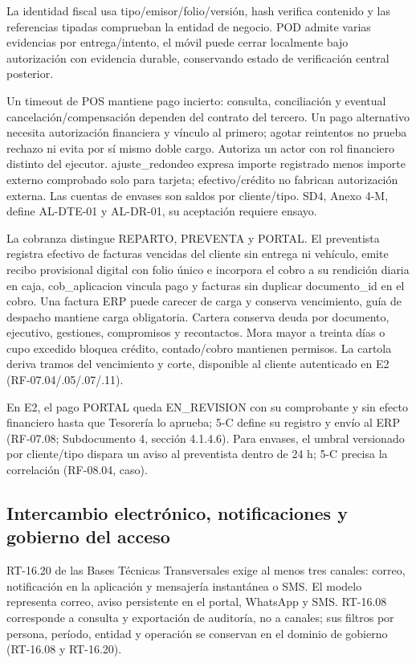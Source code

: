 La identidad fiscal usa tipo/emisor/folio/versión, hash verifica contenido y las referencias tipadas comprueban la entidad de negocio. POD admite varias evidencias por entrega/intento, el móvil puede cerrar localmente bajo autorización con evidencia durable, conservando estado de verificación central posterior.

Un timeout de POS mantiene pago incierto: consulta, conciliación y eventual cancelación/compensación dependen del contrato del tercero. Un pago alternativo necesita autorización financiera y vínculo al primero; agotar reintentos no prueba rechazo ni evita por sí mismo doble cargo. Autoriza un actor con rol financiero distinto del ejecutor. ajuste\_redondeo expresa importe registrado menos importe externo comprobado solo para tarjeta; efectivo/crédito no fabrican autorización externa. Las cuentas de envases son saldos por cliente/tipo. SD4, Anexo 4-M, define AL-DTE-01 y AL-DR-01, su aceptación requiere ensayo.

La cobranza distingue REPARTO, PREVENTA y PORTAL. El preventista registra efectivo de facturas vencidas del cliente sin entrega ni vehículo, emite recibo provisional digital con folio único e incorpora el cobro a su rendición diaria en caja, cob\_aplicacion vincula pago y facturas sin duplicar documento\_id en el cobro. Una factura ERP puede carecer de carga y conserva vencimiento, guía de despacho mantiene carga obligatoria. Cartera conserva deuda por documento, ejecutivo, gestiones, compromisos y recontactos. Mora mayor a treinta días o cupo excedido bloquea crédito, contado/cobro mantienen permisos. La cartola deriva tramos del vencimiento y corte, disponible al cliente autenticado en E2 (RF-07.04/.05/.07/.11).

En E2, el pago PORTAL queda EN\_REVISION con su comprobante y sin efecto financiero hasta que Tesorería lo aprueba; 5-C define su registro y envío al ERP (RF-07.08; Subdocumento 4, sección 4.1.4.6). Para envases, el umbral versionado por cliente/tipo dispara un aviso al preventista dentro de 24 h; 5-C precisa la correlación (RF-08.04, caso).

\subsection{Intercambio electrónico, notificaciones y gobierno del acceso}
\label{sec:sd5-5-1-9}

RT-16.20 de las Bases Técnicas Transversales exige al menos tres canales: correo, notificación en la aplicación y mensajería instantánea o SMS. El modelo representa correo, aviso persistente en el portal, WhatsApp y SMS. RT-16.08 corresponde a consulta y exportación de auditoría, no a canales; sus filtros por persona, período, entidad y operación se conservan en el dominio de gobierno (RT-16.08 y RT-16.20).

